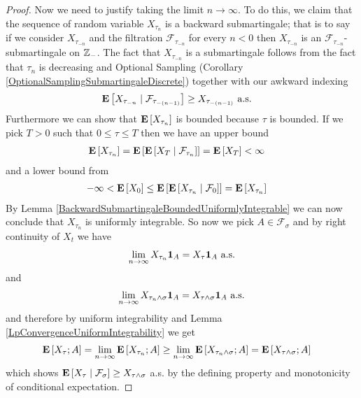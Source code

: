 \begin{proof}
Now we need to justify taking the limit $n \to \infty$.  To do this,
we claim that the sequence of random variable $X_{\tau_n}$ 
is a backward submartingale; that is to say if we consider
$X_{\tau_{-n}}$ and the filtration
$\mathcal{F}_{\tau_{-n}}$ for every $n < 0$
then $X_{\tau_{-n}}$ is an $\mathcal{F}_{\tau_{-n}}$-submartingale on
$\integers_-$.  The fact that $X_{\tau_{-n}}$ is a submartingale
follows from the fact that $\tau_n$ is decreasing and Optional
Sampling (Corollary \ref{OptionalSamplingSubmartingaleDiscrete})
together
with our awkward indexing
\begin{align*}
\cexpectationlong{\mathcal{F}_{\tau_{-(n-1)}}}{X_{\tau_{-n}}} &\geq
X_{\tau_{-(n-1)}} \text{ a.s.}
\end{align*}
Furthermore we can show that $\expectation{X_{\tau_n}}$ is bounded
because $\tau$ is bounded.
If we pick $T > 0$ such that $0 \leq \tau \leq T$ then we have an upper bound
\begin{align*}
\expectation{X_{\tau_{n}}}
&=\expectation{\cexpectationlong{\mathcal{F}_{\tau_n}}{X_{T}}} =
\expectation{X_T} < \infty
\end{align*}
and a lower bound from 
\begin{align*}
-\infty &< \expectation{X_0} \leq
\expectation{\cexpectationlong{\mathcal{F}_0}{X_{\tau_n}}} = \expectation{X_{\tau_n}}
\end{align*}
By Lemma \ref{BackwardSubmartingaleBoundedUniformlyIntegrable} we can
now conclude that $X_{\tau_{n}}$ is uniformly integrable.
So now we pick $A \in \mathcal{F}_{\sigma}$ and by right continuity of
$X_t$ we have
\begin{align*}
\lim_{n \to \infty} X_{\tau_n} \characteristic{A} = X_\tau
\characteristic{A} \text{ a.s.}
\end{align*}
and
\begin{align*}
\lim_{n \to \infty} X_{\tau_n \wedge \sigma} \characteristic{A} =
X_{\tau \wedge \sigma}
\characteristic{A} \text{ a.s.}
\end{align*}
and therefore by uniform integrability and Lemma
\ref{LpConvergenceUniformIntegrability} we get
\begin{align*}
\expectation{X_\tau ; A} &= \lim_{n \to \infty}
\expectation{X_{\tau_n} ; A} \geq 
\lim_{n \to \infty} \expectation{X_{\tau_n \wedge \sigma} ; A} =
\expectation{X_{\tau \wedge \sigma} ; A}
\end{align*}
which shows $\cexpectationlong{\mathcal{F}_\sigma}{X_\tau} \geq
X_{\tau \wedge \sigma}$ a.s. by the defining property and monotonicity
of conditional expectation.
\end{proof}

